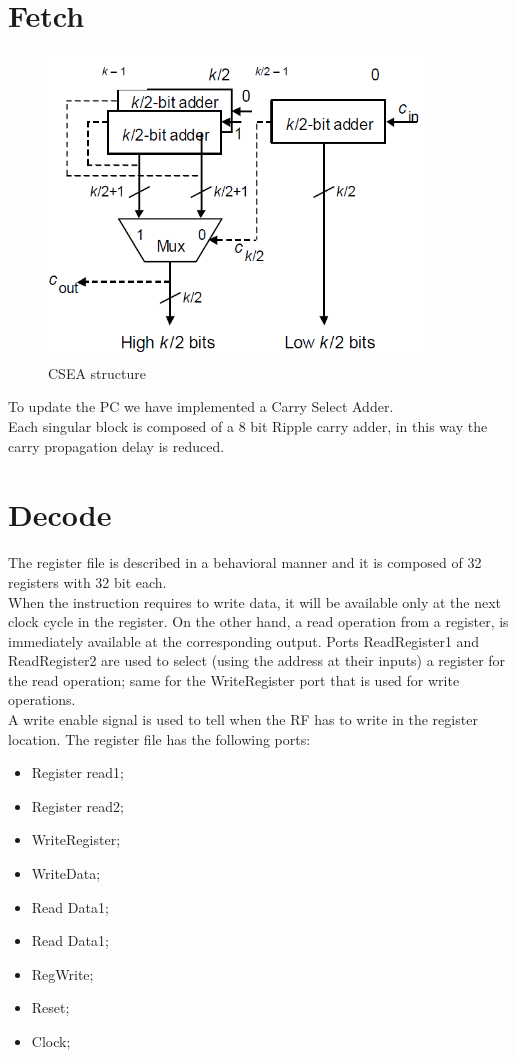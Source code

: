 \section{Fetch}
\begin{figure}[h!]
	\centering
	\includegraphics[width=10cm]{./images/CSEA}
	\caption{CSEA structure}
	\label{fig2.3}
\end{figure}
To update the PC we have implemented a Carry Select Adder. \\
Each singular block is composed of a 8 bit Ripple carry adder, in this way the carry propagation delay is reduced.
\section{Decode}
The register file is described in a behavioral manner and it is composed of 32 registers with 32 bit each.\\
When the instruction requires to write data, it will be available only at the next clock cycle in the register. On the other hand, a read operation from a register, is immediately available at the corresponding output.
Ports ReadRegister1 and ReadRegister2 are used to select (using the address at their inputs) a register for the read operation; same for the WriteRegister port that is used for write operations.\\
A write enable signal is used to tell when the RF has to write in the register location.
The register file has the following ports:
\begin{itemize}
	\item Register read1;
	\item Register read2;
	\item WriteRegister;
	\item WriteData;
	\item Read Data1;
	\item Read Data1;
	\item RegWrite;
	\item Reset;
	\item Clock;		
\end{itemize}

